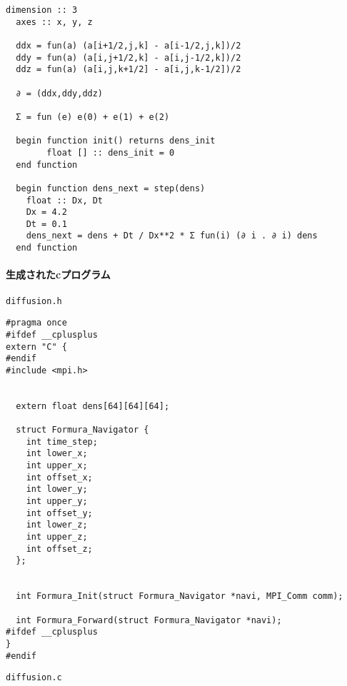\documentclass{jsarticle}
\begin{document}
\begin{lstlisting}[mathescape]
  dimension :: 3
  axes :: x, y, z

  ddx = fun(a) (a[i+1/2,j,k] - a[i-1/2,j,k])/2
  ddy = fun(a) (a[i,j+1/2,k] - a[i,j-1/2,k])/2
  ddz = fun(a) (a[i,j,k+1/2] - a[i,j,k-1/2])/2

  ∂ = (ddx,ddy,ddz)

  Σ = fun (e) e(0) + e(1) + e(2)

  begin function init() returns dens_init
        float [] :: dens_init = 0
  end function

  begin function dens_next = step(dens)
    float :: Dx, Dt
    Dx = 4.2
    Dt = 0.1
    dens_next = dens + Dt / Dx**2 * Σ fun(i) (∂ i . ∂ i) dens
  end function
\end{lstlisting}


\paragraph{生成されたcプログラム}

\verb`diffusion.h`

\begin{breakbox}
\begin{verbatim}
#pragma once
#ifdef __cplusplus
extern "C" {
#endif
#include <mpi.h>


  extern float dens[64][64][64];

  struct Formura_Navigator {
    int time_step;
    int lower_x;
    int upper_x;
    int offset_x;
    int lower_y;
    int upper_y;
    int offset_y;
    int lower_z;
    int upper_z;
    int offset_z;
  };


  int Formura_Init(struct Formura_Navigator *navi, MPI_Comm comm);

  int Formura_Forward(struct Formura_Navigator *navi);
#ifdef __cplusplus
}
#endif
\end{verbatim}
\end{breakbox}

\verb`diffusion.c`
\end{document}
